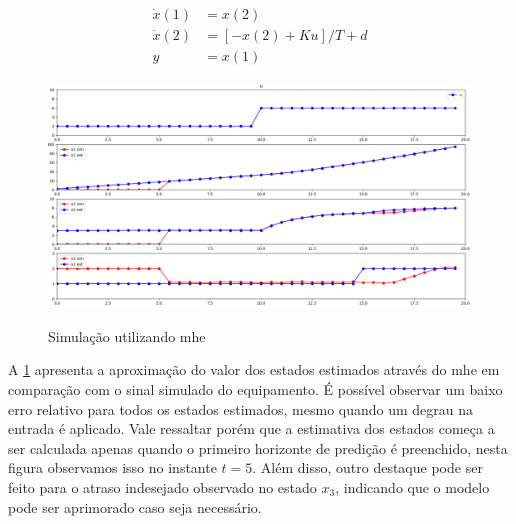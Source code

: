 \begin{subequations}
	\label{eq:motor_dynamics_ss}
	\begin{align}
		\dot{x}(1) &= x(2) 					\\
		\dot{x}(2) &= [-x(2) + Ku] / T + d	\\
		y &= x(1)
	\end{align}
\end{subequations}

	
\begin{figure}[h]
	\caption{Simulação utilizando \acrlong{mhe}}
	\begin{center}
		\includegraphics[width=1\textwidth]{./5_images/fig_mhe_example.png} 
		\label{fig:mhe_example}
	\end{center}
	\centering
\end{figure}


A \cref{fig:mhe_example} apresenta a aproximação do valor dos estados estimados através do \acrshort{mhe}
em comparação com o sinal simulado do equipamento. É possível observar um baixo erro relativo para todos
os estados estimados, mesmo quando um degrau na entrada é aplicado. Vale ressaltar porém que a estimativa
dos estados começa a ser calculada apenas quando o primeiro horizonte de predição é preenchido, nesta figura
observamos isso no instante $t=5$. Além disso, outro destaque pode ser feito para o atraso indesejado 
observado no estado $x_3$, indicando que o modelo pode ser aprimorado caso seja necessário.